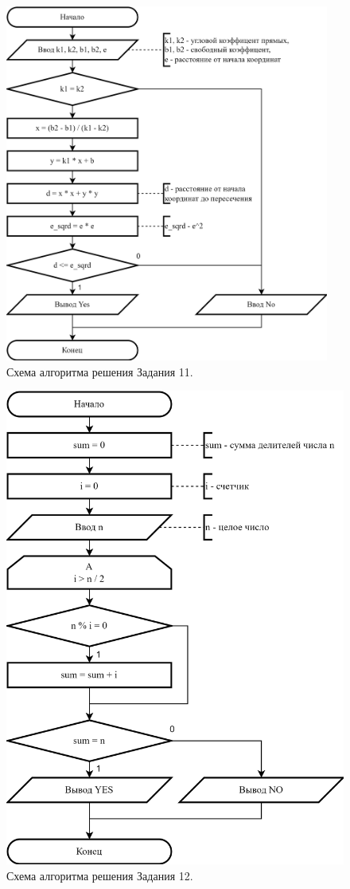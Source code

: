 \documentclass[oneside,a4paper,14pt]{extarticle}
\begin{document}
\begin{figure}
	\centering
	\includegraphics[width=0.95\textwidth]{img/11-scheme.png} %
	\caption{Схема алгоритма решения Задания 11.} %
\end{figure}
\begin{figure}
	\centering
	\includegraphics[height=0.9\textheight]{img/12-scheme.png} %
	\caption{Схема алгоритма решения Задания 12.} %
\end{figure}
\end{document}
